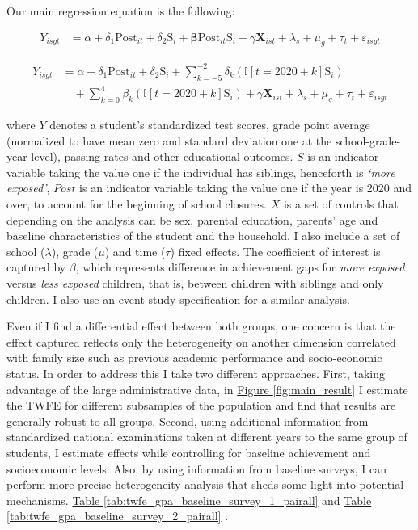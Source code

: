Our main regression equation is the following:

    \begin{align}
    Y_{isgt} &= \alpha + \delta_1 \text{Post}_{it} + \delta_2 \text{S}_{i}   + \boldsymbol{\beta} \text{Post}_{it} \text{S}_{i}  + \gamma\mathbf{X}_{ist} + \lambda_s + \mu_g + \tau_t + \varepsilon_{isgt}
    \end{align}

     \begin{align}
    Y_{isgt} &= \alpha + \delta_1 \text{Post}_{it} + \delta_2 \text{S}_{i}   + \sum_{k=-5}^{-2} \delta_k (\mathbb{I}[t = 2020+k] \text{S}_{i}) \nonumber \\
    & \quad + \sum_{k=0}^{4} \beta_k (\mathbb{I}[t = 2020 + k]  \text{S}_{i})  + \gamma\mathbf{X}_{ist} + \lambda_s + \mu_g + \tau_t + \varepsilon_{isgt}
    \end{align}   


where $Y$ denotes a student’s standardized test scores, grade point average (normalized to have mean zero and standard deviation one at the school-grade-year level), passing rates and other educational outcomes. $S$ is an indicator variable taking the value one if the individual has siblings, henceforth is \textit{‘more exposed’}, $Post$ is an indicator variable taking the value one if the year is 2020 and over, to account for the beginning of school closures. $X$ is a set of controls that depending on the analysis can be sex, parental education, parents' age and baseline characteristics of the student and the household. I also include a set of school  ($\lambda$), grade  ($\mu$) and time ($\tau$) fixed effects.  The coefficient of interest is captured by $\beta$, which represents difference in achievement gaps for \textit{more exposed} versus \textit{less exposed} children, that is, between children with siblings and only children. I also use an event study specification for a similar analysis.

Even if I find a differential effect between both groups, one concern is that the effect captured reflects only the heterogeneity on another dimension correlated with family size such as previous academic performance and socio-economic status. In order to address this I take two different approaches. First, taking advantage of the large administrative data, in \hyperref[fig:main_result]{Figure \ref{fig:main_result}} I estimate the TWFE for different subsamples of the population and find that results are generally robust to all groups. Second, using additional information from standardized national examinations taken at different years to the same group of students, I estimate effects while controlling for baseline achievement and socioeconomic levels. Also, by using information from baseline surveys, I can perform more precise heterogeneity analysis that sheds some light into potential mechanisms. \hyperref[tab:twfe_gpa_baseline_survey_1_pairall]{Table \ref{tab:twfe_gpa_baseline_survey_1_pairall}}
 and \hyperref[tab:twfe_gpa_baseline_survey_2_pairall]{Table \ref{tab:twfe_gpa_baseline_survey_2_pairall}}
.

